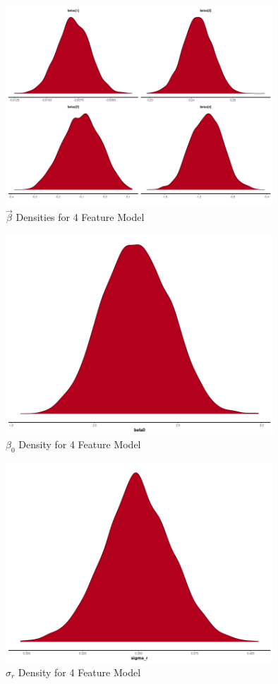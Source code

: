 \documentclass[11pt]{article}
\begin{document}
\begin{figure}[h!] 
	\centering
  \includegraphics[height=75mm]{density_betas.png}
  \caption{$\vec{\beta}$ Densities for 4 Feature Model}
  \label{fig:dbetas}
\end{figure}

\begin{figure}[h!] 
	\centering
  \includegraphics[height=75mm]{density_beta0.png}
  \caption{$\beta_0$ Density for 4 Feature Model}
  \label{fig:dbeta0}
\end{figure}

\begin{figure}[h!] 
	\centering
  \includegraphics[height=75mm]{density_sigma_r.png}
  \caption{$\sigma_r$ Density for 4 Feature Model}
  \label{fig:dsigma_r}
\end{figure}
\end{document}

